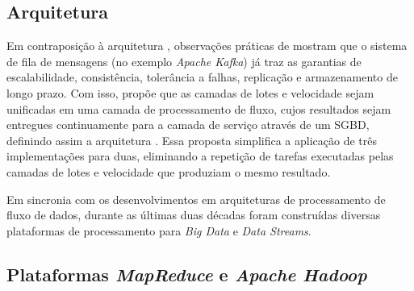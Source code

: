 

\subsection{Arquitetura \kappaa}

Em contraposição à arquitetura \lambdaa, observações práticas de 
 mostram que o sistema de fila de mensagens
(no exemplo \emph{Apache Kafka}) já traz as garantias de
escalabilidade, consistência, tolerância a falhas, replicação e armazenamento de longo prazo.
Com isso,  propõe que as camadas de lotes e velocidade sejam
unificadas em uma camada de processamento de fluxo, cujos resultados sejam entregues
continuamente para a camada de serviço através de um SGBD, definindo assim a arquitetura \kappaa.
Essa proposta simplifica a aplicação de três implementações para duas, eliminando a
repetição de tarefas executadas pelas camadas de lotes e velocidade que
produziam o mesmo resultado.



Em sincronia com os desenvolvimentos em arquiteturas de processamento de fluxo de dados,
durante as últimas duas décadas foram construídas diversas plataformas de
processamento para \emph{Big Data} e \emph{Data Streams}.

\subsection{Plataformas \emph{MapReduce} e \emph{Apache Hadoop}}


